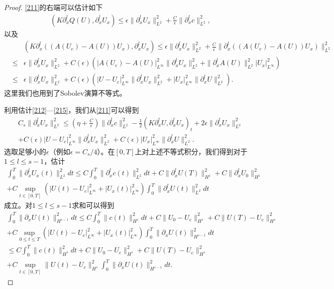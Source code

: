 \begin{proof}
\eqref{211}的右端可以估计如下
\begin{eqnarray}\label{214}
  (K \partial^l_x Q(U),\partial^l_x U_x) \le \epsilon \|\partial^l_x U_x\|_{L^2}^2 + \frac{C}{\epsilon} \|\partial^l_x c\|_{L^2}^2,
\end{eqnarray}
以及
\begin{eqnarray}\label{215}
  && (K\partial^l_x ((A(U_e)-A(U))U_x),\partial^l_x U_x) \le \epsilon\|\partial^l_x U_x\|_{L^2}^2 + \frac{C}{\epsilon} \|\partial^l_x( (A(U_e)-A(U))U_x)\|_{L^2}^2 \nonumber \\
  &\le& \epsilon \|\partial^l_x U_x \|_{L^2}^2 + C(\epsilon)( |A(U_e)-A(U )|_{L^\infty}^2 \|\partial^l_x U_x\|^2_{L^2}+\|\partial^l_x A(U)\|_{L^2}^2|U_x|_{L^\infty}^2) \nonumber \\
  &\le& \epsilon \|\partial^l_x U_x\|_{L^2}^2 + C(\epsilon) (|U-U_e|_{L^\infty}^2 \|\partial^l_x U_x\|_{L^2}^2 + |U_x|_{L^\infty}^2 \|\partial^l_x U\|_{L^2}^2).
\end{eqnarray}
这里我们也用到了Sobolev演算不等式。

利用估计\eqref{212}—\eqref{215}，我们从\eqref{211}可以得到
\begin{multline*}
  C_s \|\partial^l_x U_x\|^2_{L^2} \le (\eta+\frac{C}{\epsilon}) \|\partial^l_x c\|_{L^2}^2-\frac{1}{2} (K \partial^l_x U,\partial^l_x U_x)_t  + 2\epsilon \|\partial^l_x U_x\|^2_{L^2} \\
  +C(\epsilon) |U-U_e|_{L^\infty}^2 \|\partial^l_x U_x\|_{L^2}^2 + C(\epsilon) |U_x|_{L^\infty}^2 \|\partial^l_x U\|_{L^2}^2.
\end{multline*}
选取足够小的$\epsilon$（例如$\epsilon = C_s/4$）。在$[0,T]$上对上述不等式积分，我们得到对于$1\le l \le s-1$，估计
\begin{multline*}
  \int_0^T \|\partial^l_x U_x(t)\|^2_{L^2} dt \le C \int_0^T \|\partial^l_x c(t)\|^2_{L^2} dt
  +C\|\partial^l_x U(T)\|_{H^1}^2 + C\|\partial^l_x U_0\|_{H^1}^2 \\
  + C \sup_{t\in [0,T]} (|U(t)-U_e|_{L^\infty}^2 + |U_x(t)|_{L^\infty}^2) \int_0^T \|\partial^l_x U(t)\|_{L^2}^2 dt
\end{multline*}
成立。对$1 \le l \le s-1$求和可以得到
\begin{multline}\label{216}
  \int_0^T \|\partial_x U(t)\|^2_{H^{s-1}} dt \le C \int_0^T \|c(t)\|^2_{H^s} dt + C\|U_0-U_e\|^2_{H^s} + C\|U(T)-U_e\|^2_{H^s} \\+C \sup_{0 \le t \le T}(|U(t)-U_e|_{L^\infty}^2 + |U_x(t)|_{L^\infty}^2) \int_0^T \|\partial_x U(t)\|_{H^{s-1}}^2 dt \\
  \le C \int_0^T \|c(t)\|_{H^s}^2 dt + C \|U_0-U_e\|_{H^s}^2 + C\|U(T) -U_e\|_{H^s}^2  \\ + C \sup_{t \in [0,T] }\|U(t)-U_e\|_{H^s}^2 \int_0^T \|\partial_x U(t)\|_{H^{s-1}}^2 dt.
\end{multline}


\end{proof}
